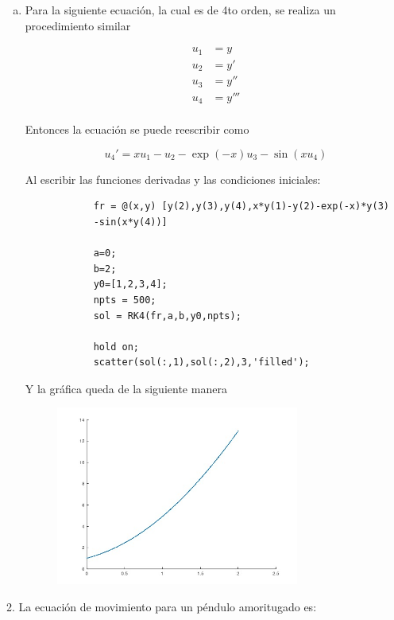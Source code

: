 \documentclass[a4paper, 12pt]{article}
\begin{document}
\begin{enumerate}[a)]
        \item Para la siguiente ecuación, la cual es de 4to orden, se realiza un procedimiento similar
        
        \begin{align*}
            u_1 &= y \\
            u_2 &= y' \\
            u_3 &= y'' \\
            u_4 &= y''' \\
        \end{align*}

        Entonces la ecuación se puede reescribir como

        \[
            u_4' = xu_1 - u_2 - \exp(-x)u_3 - \sin(xu_4)
        \]

        Al escribir las funciones derivadas y las condiciones iniciales:

        \begin{verbatim}
            fr = @(x,y) [y(2),y(3),y(4),x*y(1)-y(2)-exp(-x)*y(3)
            -sin(x*y(4))]

            a=0;
            b=2;
            y0=[1,2,3,4];
            npts = 500;
            sol = RK4(fr,a,b,y0,npts);

            hold on;
            scatter(sol(:,1),sol(:,2),3,'filled');
        \end{verbatim}

        Y la gráfica queda de la siguiente manera

        \begin{figure}[ht!]
            \centering
            \includegraphics[width=8cm]{img/e1b.jpeg}
        \end{figure}

    \end{enumerate}

    2. La ecuación de movimiento para un péndulo amoritugado es:
\end{document}
